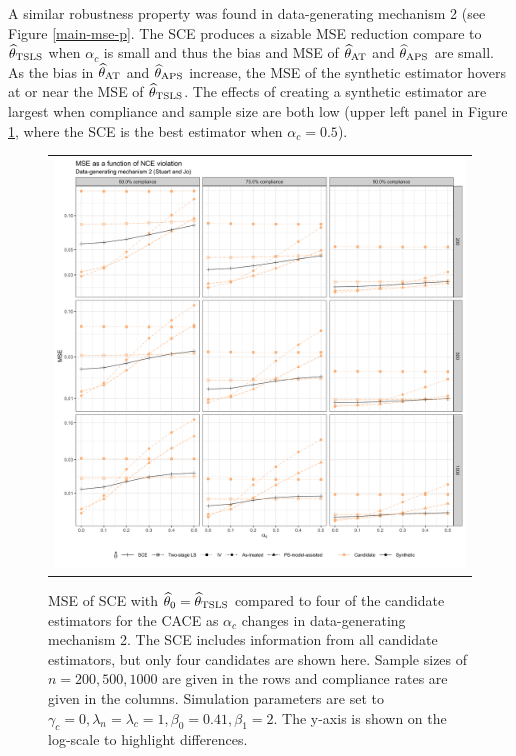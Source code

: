\documentclass{article}
\def\sat{_{\text{AT}}}
\def\stsls{_{\text{TSLS}}}
\def\saps{_{\text{APS}}}
\begin{document}
A similar robustness property was found in data-generating mechanism 2 (see Figure \ref{main-mse-p}. The SCE produces a sizable MSE reduction compare to $\thetahat\stsls$ when $\alpha_c$ is small and thus the bias and MSE of $\thetahat\sat$ and $\thetahat\saps$ are small. As the bias in $\thetahat\sat$ and $\thetahat\saps$ increase, the MSE of the synthetic estimator hovers at or near the MSE of $\thetahat\stsls$. The effects of creating a synthetic estimator are largest when compliance and sample size are both low (upper left panel in Figure \ref{main-mse-pl}, where the SCE is the best estimator when $\alpha_c = 0.5$). 
%
\begin{figure}
\centering
\begin{tabular}{c}
\includegraphics[width =\textwidth]{figures/main-sim-mse-plot.png}
\end{tabular}\vspace{0.2in}
\caption{MSE of SCE with $\thetahat_0 = \thetahat\stsls$ compared to four of the candidate estimators for the CACE as $\alpha_c$ changes in data-generating mechanism 2. The SCE includes information from all candidate estimators, but only four candidates are shown here. Sample sizes of $n = 200, 500, 1000$ are given in the rows and compliance rates are given in the columns. Simulation parameters are set to $\gamma_c = 0, \lambda_n = \lambda_c = 1, \beta_0 = 0.41, \beta_1 = 2$. The y-axis is shown on the log-scale to highlight differences.}\label{main-mse-pl}
\end{figure}
%
\end{document}
